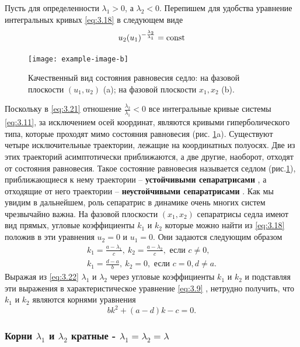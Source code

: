 Пусть для определенности $\lambda_1>0$, а $\lambda_2<0$. Перепишем для удобства уравнение интегральных кривых \eqref{eq:3.18} в следующем виде
\begin{equation}
        \label{eq:3.21}
        u_2(u_1)^{- \frac{\lambda_2}{\lambda_1}} = \textrm{const}   
\end{equation}
\begin{figure}[h!]
        \centering
        \texttt{[image: example-image-b]}
        \caption{ Качественный вид состояния равновесия седло: на фазовой плоскости $(u_1,u_2)$ (a);
на фазовой плоскости $x_1,x_2$ (b).}
        \label{fig:3.5}
\end{figure}
Поскольку в \eqref{eq:3.21} отношение $\frac{\lambda_2}{\lambda_1}<0$
все интегральные кривые системы \eqref{eq:3.11},
за исключением осей координат, являются кривыми гиперболического типа, которые проходят мимо состояния равновесия (рис. \ref{fig:3.5}a). 
Существуют
четыре исключительные траектории, лежащие на координатных
полуосях. Две из этих траекторий асимптотически приближаются, а две другие,
наоборот, отходят от состояния равновесия. Такое состояние равновесия
называется седлом (рис.\ref{fig:3.5}), приближающиеся к нему траектории --
\textbf{устойчивыми сепаратрисами} , а отходящие от него траектории --
\textbf{неустойчивыми сепаратрисами} . Как мы увидим в дальнейшем, роль
сепаратрис в динамике очень многих систем чрезвычайно важна. На фазовой
плоскости $(x_1,x_2)$ сепаратрисы седла имеют вид прямых, угловые
коэффициенты  $k_{1}$ и $k_2$   которые можно найти из \eqref{eq:3.18}  положив в эти
уравнения $u_2=0$ и $u_1=0$. Они задаются следующим образом
\begin{equation}
        \label{eq:3.22}
        \begin{aligned}
                k_1 = \frac{a-\lambda_1}{c}, ~ k_2= \frac{a-\lambda_2}{c}, \text{ если } c\neq 0,\\
                k_1 = \frac{d-a}{b}, ~k_2=0, \text{ если } c=0, d\neq a.
        \end{aligned}
\end{equation}
Выражая из \eqref{eq:3.22} $\lambda_1$ и $\lambda_2$ через угловые коэффициенты $k_1$ и $k_2$ и подставляя эти выражения в характеристическое уравнение \eqref{eq:3.9} , нетрудно получить, что 
$k_1$ и $k_2$ являются корнями уравнения
\begin{equation}
        \label{eq:3.23}
        bk^2 +(a-d) k -c =0. 
\end{equation}

\subsubsection{Корни $\lambda_1$ и $\lambda_2$ кратные - $\lambda_1=\lambda_2=\lambda$}%
\label{ssub:_korni_lambda_1_i_lambda_2_kratnye}



